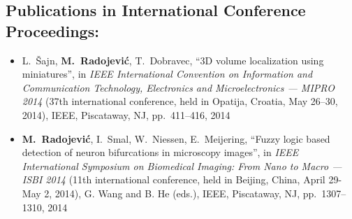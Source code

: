 \subsection*{Publications in International Conference Proceedings:}
\vspace{1ex}
\begin{itemize}
	\item L.~\v{S}ajn, \textbf{M.~Radojevi\'{c}}, T.~Dobravec, ``3D volume localization using miniatures'', in \emph{IEEE International Convention on Information and Communication Technology, Electronics and Microelectronics --- MIPRO 2014} (37th international conference, held in Opatija, Croatia, May 26--30, 2014), IEEE, Piscataway, NJ, pp.~411--416, 2014

	\item \textbf{M.~Radojevi\'{c}}, I.~Smal, W.~Niessen, E.~Meijering, ``Fuzzy logic based detection of neuron bifurcations in microscopy images'', in \emph{IEEE International Symposium on Biomedical Imaging: From Nano to Macro --- ISBI 2014} (11th international conference, held in Beijing, China, April 29-May 2, 2014), G. Wang and B. He (eds.), IEEE, Piscataway, NJ, pp.~1307--1310, 2014


\end{itemize}
